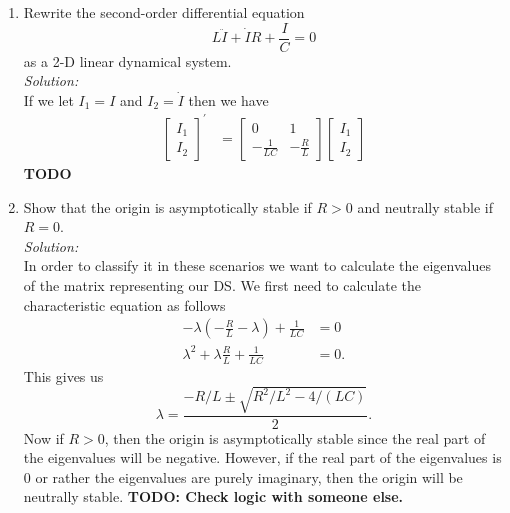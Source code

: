 \documentclass[10pt]{amsart}
\theoremstyle{nonumberplain}
\begin{document}
\begin{enumerate}[label={\bf {\arabic*}:}]
\begin{enumerate}
\item Rewrite the second-order differential equation
$$L \ddot I + \dot I R + \frac I C = 0$$
as a 2-D linear dynamical system. \\
\textit{Solution:} \\
If we let $I_1 = I$ and $I_2 = \dot I$ then we have
\begin{align*}
\begin{bmatrix}
I_1 \\ I_2
\end{bmatrix}^\prime
&= \begin{bmatrix}
0 & 1 \\
-\frac 1 {LC} & -\frac R L
\end{bmatrix} \begin{bmatrix}
I_1 \\ I_2
\end{bmatrix}
\end{align*}
\textbf{TODO} \\

\item Show that the origin is asymptotically stable if $R > 0$ and neutrally stable if $R = 0$. \\
\textit{Solution:} \\
In order to classify it in these scenarios we want to calculate the eigenvalues of the matrix representing our DS.
We first need to calculate the characteristic equation as follows
\begin{align*}
-\lambda \left(- \frac R L - \lambda \right) + \frac 1 {LC} &= 0 \\
\lambda^2 + \lambda \frac R L + \frac 1 {LC} &= 0.
\end{align*}
This gives us
\begin{equation}
\lambda = \frac {-R/L \pm \sqrt{R^2/L^2 - 4/(LC)} }{2}.
\label{eq:eq2}
\end{equation}
Now if $R > 0$, then the origin is asymptotically stable since the real part of the eigenvalues will be negative.
However, if the real part of the eigenvalues is $0$ or rather the eigenvalues are purely imaginary, then the origin will be neutrally stable.
\textbf{TODO: Check logic with someone else.} \\


\end{enumerate}
\end{enumerate}
\end{document}
